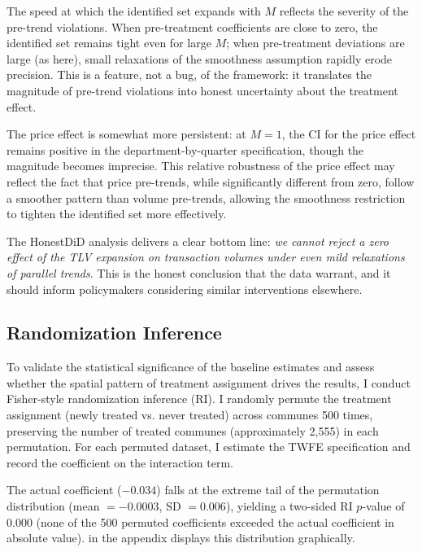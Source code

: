 \documentclass[12pt]{article}
\begin{document}
The speed at which the identified set expands with $M$ reflects the severity of the pre-trend violations. When pre-treatment coefficients are close to zero, the identified set remains tight even for large $M$; when pre-treatment deviations are large (as here), small relaxations of the smoothness assumption rapidly erode precision. This is a feature, not a bug, of the \citet{rambachan2023more} framework: it translates the magnitude of pre-trend violations into honest uncertainty about the treatment effect.

The price effect is somewhat more persistent: at $M = 1$, the CI for the price effect remains positive in the department-by-quarter specification, though the magnitude becomes imprecise. This relative robustness of the price effect may reflect the fact that price pre-trends, while significantly different from zero, follow a smoother pattern than volume pre-trends, allowing the smoothness restriction to tighten the identified set more effectively.

The HonestDiD analysis delivers a clear bottom line: \textit{we cannot reject a zero effect of the TLV expansion on transaction volumes under even mild relaxations of parallel trends}. This is the honest conclusion that the data warrant, and it should inform policymakers considering similar interventions elsewhere.

\subsection{Randomization Inference}

To validate the statistical significance of the baseline estimates and assess whether the spatial pattern of treatment assignment drives the results, I conduct Fisher-style randomization inference (RI). I randomly permute the treatment assignment (newly treated vs. never treated) across communes 500 times, preserving the number of treated communes (approximately 2,555) in each permutation. For each permuted dataset, I estimate the TWFE specification and record the coefficient on the interaction term.

The actual coefficient ($-0.034$) falls at the extreme tail of the permutation distribution (mean $= -0.0003$, SD $= 0.006$), yielding a two-sided RI $p$-value of 0.000 (none of the 500 permuted coefficients exceeded the actual coefficient in absolute value).  in the appendix displays this distribution graphically.
\end{document}
